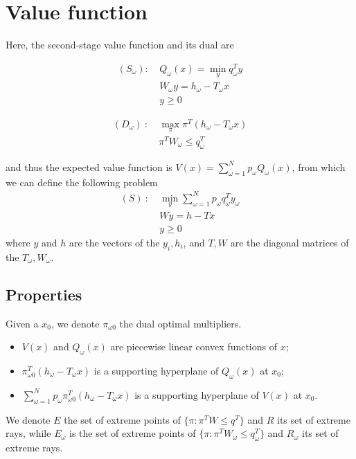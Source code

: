 \documentclass[12pt, openany]{report}
\theoremstyle{definition}
\begin{document}
\section{Value function}
Here, the second-stage value function and its dual are \\
\begin{minipage}{.5\textwidth}
    \begin{equation}\label{eq:Sw}
        \begin{aligned}
            (S_\omega): \ &Q_\omega(x) = \min_y q^T_\omega y\\
            & W_\omega y=h_\omega - T_\omega x\\
            & y\ge 0
        \end{aligned}
    \end{equation}
\end{minipage} 
\begin{minipage}{.5\textwidth}
    \begin{equation}
        \begin{aligned}
            (D_\omega)\ : \ &\max_\pi \pi^T (h_\omega-T_\omega x)\\
            & \pi^TW_\omega \le q^T_\omega 
        \end{aligned}
    \end{equation}
\end{minipage} 
and thus the expected value function is $V(x) = \sum_{\omega = 1}^N p_\omega Q_\omega (x)$, from which we can define the following problem
\begin{equation}
	\begin{aligned}
		(S) \ : \ & \min_y \sum_{\omega = 1}^N p_\omega q_\omega^Ty_\omega \\
		& Wy=h-Tx\\
		& y\ge 0
	\end{aligned}
\end{equation}
where $y$ and $h$ are the vectors of the $y_i,h_i$, and $T,W$ are the diagonal matrices of the $T_\omega,W_\omega$. 
\subsection{Properties}
Given a $x_0$, we denote $\pi_{\omega0}$ the dual optimal multipliers.
\begin{itemize}
    \item $V(x)$ and $Q_\omega(x)$ are piecewise linear convex functions of $x$;
    \item $\pi_{\omega0}^T(h_\omega-T_\omega x)$ is a supporting hyperplane of $Q_\omega(x)$ at $x_0$;
    \item $\sum_{\omega =1}^N p_\omega\pi_{\omega0}^T(h_\omega-T_\omega x)$ is a supporting hyperplane of $V(x)$ at $x_0$.
\end{itemize}
We denote $E$ the set of extreme points of $\{\pi:\pi^TW\le q^T\}$ and $R$ its set of extreme rays, while $E_\omega$ is the set of extreme points of $\{\pi:\pi^TW_\omega \le q_\omega^T\}$ and $R_\omega$ its set of extreme rays. \\
\end{document}
